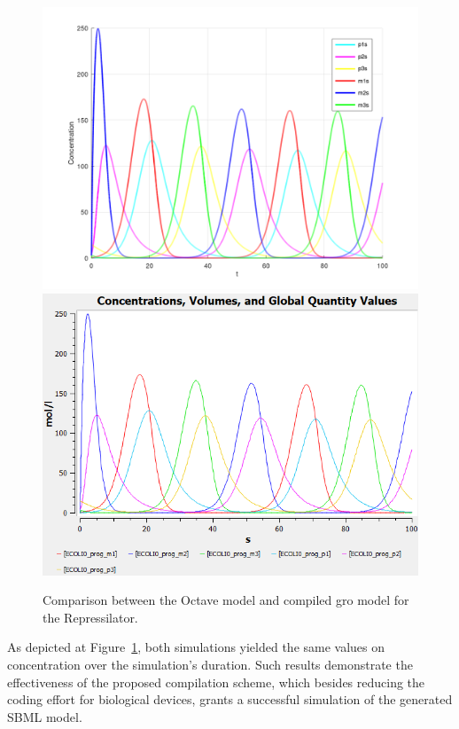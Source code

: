 \documentclass[12pt]{article}
\begin{document}
    \begin{figure}[ht]
    \centering
      \includegraphics[width=\linewidth]{repressilator_octave.png}
    \endminipage\hfill
      \includegraphics[width=\linewidth]{repressilator_copasi.png}
    \endminipage\hfill
    \caption{Comparison between the Octave model and compiled gro model for the Repressilator.}
    \label{fig:repressilator_comparison}
    \end{figure}

    As depicted at Figure~\ref{fig:repressilator_comparison}, both simulations yielded the same values on concentration over the simulation's duration. Such results demonstrate the effectiveness of the proposed compilation scheme, which besides reducing the coding effort for biological devices, grants a successful simulation of the generated SBML model.
\end{document}
